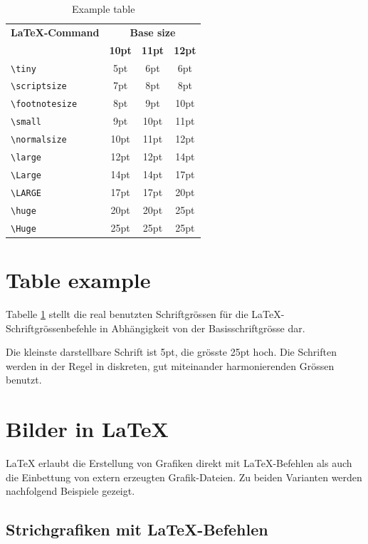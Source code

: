 \documentclass[11pt, a4paper]{article}
\newcommand{\ltx}{\LaTeX}
\begin{document}
\begin{table}[t]
\caption{Example table  \label{tab:Schriftgroessen}}
\centering
\begin{tabular}{lccc}
\toprule
\textbf{\ltx-Command} & \multicolumn{3}{c}{\textbf{Base size}}\\
\cline{2-4} & \textbf{10pt} & \textbf{11pt} & \textbf{12pt}\\
\midrule
\midrule
\verb+\tiny+			& 5pt & 6pt 	& 6pt\\
\verb+\scriptsize+		& 7pt & 8pt		& 8pt\\
\verb+\footnotesize+	& 8pt & 9pt		& 10pt\\
\verb+\small+			& 9pt & 10pt	& 11pt\\
\midrule
\midrule
\verb+\normalsize+		& 10pt	& 11pt	& 12pt\\
\midrule
\midrule
\verb+\large+			& 12pt	& 12pt	& 14pt\\
\verb+\Large+			& 14pt	& 14pt	& 17pt\\
\verb+\LARGE+			& 17pt	& 17pt	& 20pt\\
\verb+\huge+			& 20pt	& 20pt	& 25pt\\
\verb+\Huge+			& 25pt	& 25pt	& 25pt\\
\bottomrule
\end{tabular}
\end{table}%

\section{Table example}
Tabelle \ref{tab:Schriftgroessen} stellt die real benutzten Schriftgrössen für die \ltx-Schriftgrössenbefehle in Abhängigkeit von der Basisschriftgrösse dar.\par
Die kleinste darstellbare Schrift ist 5pt, die grösste 25pt hoch. Die Schriften werden in der Regel in diskreten, gut miteinander harmonierenden Grössen benutzt.

\section{Bilder in \ltx}
\ltx{} erlaubt die Erstellung von Grafiken direkt mit \ltx-Befehlen als auch die Einbettung von extern erzeugten Grafik-Dateien. Zu beiden Varianten werden nachfolgend Beispiele gezeigt.




\subsection{Strichgrafiken mit \ltx-Befehlen}
\end{document}
